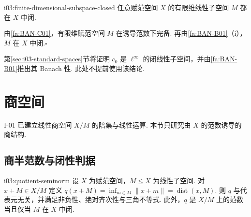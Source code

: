 \begin{FACorollary}[B][有限维子空间闭]{i03:finite-dimensional-subspace-closed}
任意赋范空间 \(\displaystyle X\) 的有限维线性子空间 \(\displaystyle M\) 都在 \(\displaystyle X\) 中闭.
\end{FACorollary}

\begin{FAProof}
由\autoref{fa:BAN-C01}，有限维赋范空间 \(\displaystyle M\) 在诱导范数下完备. 再由\autoref{fa:BAN-B01}（i），\(\displaystyle M\) 在 \(\displaystyle X\) 中闭.\hfill\(\square\)
\end{FAProof}

\begin{FARemark}[标准闭子空间预告]
第\ref{sec:i03-standard-spaces}节将证明 \(\displaystyle c_0\) 是 \(\displaystyle \ell^\infty\) 的闭线性子空间，并由\autoref{fa:BAN-B01}推出其 Banach 性. 此处不提前使用该结论.
\end{FARemark}

\section{商空间}\label{sec:i03-quotients}

I-01 已建立线性商空间 \(\displaystyle X/M\) 的陪集与线性运算. 本节只研究由 \(\displaystyle X\) 的范数诱导的商结构.

\subsection{商半范数与闭性判据}

\begin{FAProposition}[B][商半范数及其正定性]{i03:quotient-seminorm}
设 \(\displaystyle X\) 为赋范空间，\(\displaystyle M\leqslant X\) 为线性子空间. 对 \(\displaystyle x+M\in X/M\) 定义 \(\displaystyle q(x+M)=\inf_{m\in M}\|x+m\|=\operatorname{dist}(x,M)\).
则 \(\displaystyle q\) 与代表元无关，并满足非负性、绝对齐次性与三角不等式. 此外，\(\displaystyle q\) 是 \(\displaystyle X/M\) 上的范数当且仅当 \(\displaystyle M\) 在 \(\displaystyle X\) 中闭.
\end{FAProposition}

